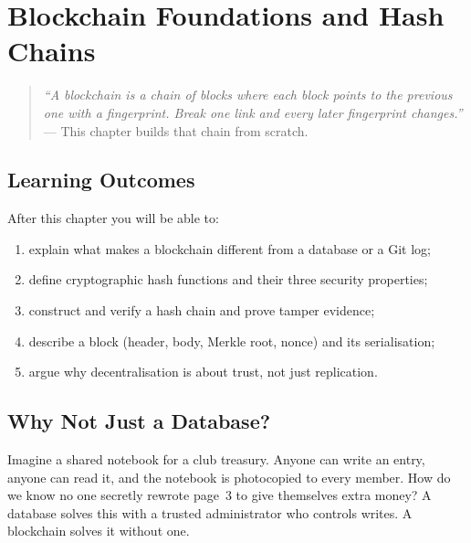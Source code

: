 \chapter{Blockchain Foundations and Hash Chains}\label{ch:foundations}

\begin{quote}
\emph{``A blockchain is a chain of blocks where each block points to the previous one with a fingerprint. Break one link and every later fingerprint changes.''} --- This chapter builds that chain from scratch.
\end{quote}

\noindent{}
\vspace{0.4em}

\section*{Learning Outcomes}
After this chapter you will be able to:
\begin{enumerate}[label=(L\arabic*)]
    \item explain what makes a blockchain different from a database or a Git log;
    \item define cryptographic hash functions and their three security properties;
    \item construct and verify a hash chain and prove tamper evidence;
    \item describe a block (header, body, Merkle root, nonce) and its serialisation;
    \item argue why decentralisation is about trust, not just replication.
\end{enumerate}

\section{Why Not Just a Database?}\label{sec:why-not-db}
Imagine a shared notebook for a club treasury. Anyone can write an entry, anyone can read it, and the notebook is photocopied to every member. How do we know no one secretly rewrote page~3 to give themselves extra money? A database solves this with a trusted administrator who controls writes. A blockchain solves it without one.

